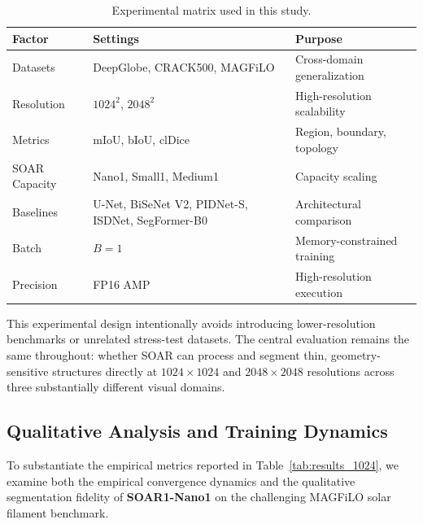 \documentclass[11pt,a4paper]{article}
\begin{document}
\begin{table}[t]
\centering
\caption{Experimental matrix used in this study.}
\label{tab:experimental_matrix}
\setlength{\tabcolsep}{5pt}
\renewcommand{\arraystretch}{1.15}
\begin{tabular}{lll}
\toprule
\textbf{Factor} & \textbf{Settings} & \textbf{Purpose} \\
\midrule
Datasets &
DeepGlobe, CRACK500, MAGFiLO &
Cross-domain generalization \\

Resolution &
$1024^2$, $2048^2$ &
High-resolution scalability \\

Metrics &
mIoU, bIoU, clDice &
Region, boundary, topology \\

SOAR Capacity &
Nano1, Small1, Medium1 &
Capacity scaling \\

Baselines &
U-Net, BiSeNet V2, PIDNet-S,
ISDNet, SegFormer-B0 &
Architectural comparison \\

Batch &
$B=1$ &
Memory-constrained training \\

Precision &
FP16 AMP &
High-resolution execution \\

\bottomrule
\end{tabular}
\end{table}

This experimental design intentionally avoids introducing lower-resolution 
benchmarks or unrelated stress-test datasets. The central evaluation remains 
the same throughout: whether SOAR can process and segment thin, 
geometry-sensitive structures directly at $1024\times1024$ and 
$2048\times2048$ resolutions across three substantially different visual 
domains.

\subsection{Qualitative Analysis and Training Dynamics}

To substantiate the empirical metrics reported in Table~\ref{tab:results_1024}, we examine both the empirical convergence dynamics and the qualitative segmentation fidelity of \textbf{SOAR1-Nano1} on the challenging MAGFiLO solar filament benchmark.
\end{document}

